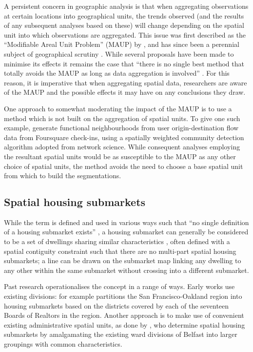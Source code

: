 \documentclass[a4paper, nobind]{templates/ociamthesis}
\begin{document}
A persistent concern in geographic analysis is that when aggregating observations at certain locations into geographical units, the trends observed (and the results of any subsequent analyses based on these) will change depending on the spatial unit into which observations are aggregated. This issue was first described as the ``Modifiable Areal Unit Problem'' (MAUP) by \citet{openshaw1979}, and has since been a perennial subject of geographical scrutiny \citep{openshaw1984, fotheringham1991, tranmer2001, duque2018}. While several proposals have been made to minimise its effects \citep{king1997, nakaya2000, holt1996} it remains the case that ``there is no single best method that totally avoids the MAUP as long as data aggregation is involved'' \citep[77]{zhang2005}. For this reason, it is imperative that when aggregating spatial data, researchers are aware of the MAUP and the possible effects it may have on any conclusions they draw.

One approach to somewhat moderating the impact of the MAUP is to use a method which is not built on the aggregation of spatial units. To give one such example, \citet{calafiore2021} generate functional neighbourhoods from user origin-destination flow data from Foursquare check-ins, using a spatially weighted community detection algorithm adopted from network science. While consequent analyses employing the resultant spatial units would be as susceptible to the MAUP as any other choice of spatial units, the method avoids the need to choose a base spatial unit from which to build the segmentations.

\hypertarget{spatial-housing-submarkets}{%
\subsection{Spatial housing submarkets}\label{spatial-housing-submarkets}}

While the term is defined and used in various ways such that ``no single definition of a housing submarket exists'' \citep[457]{raeOnlineHousingSearch2015}, a housing submarket can generally be considered to be a set of dwellings sharing similar characteristics \citep{bourassa1999}, often defined with a spatial contiguity constraint such that there are no multi-part spatial housing submarkets; a line can be drawn on the submarket map linking any dwelling to any other within the same submarket without crossing into a different submarket.

Past research operationalises the concept in a range of ways. Early works use existing divisions: for example \citet{palm1978} partitions the San Francisco-Oakland region into housing submarkets based on the districts covered by each of the seventeen Boards of Realtors in the region. Another approach is to make use of convenient existing administrative spatial units, as done by \citet{adair1996}, who determine spatial housing submarkets by amalgamating the existing ward divisions of Belfast into larger groupings with common characteristics.
\end{document}

